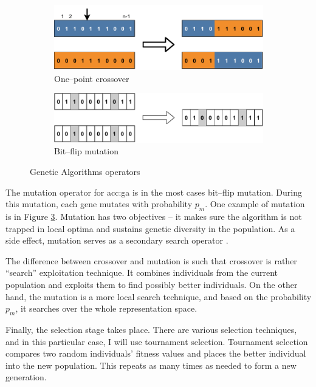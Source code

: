\begin{figure}
    \begin{subfigure}[b]{0.4\textwidth}
        \includegraphics[width=\textwidth]{img/master_onepointcrossover.pdf}
        \caption{One--point crossover}
        \label{fig:gaonepointcrossover}
    \end{subfigure}
    \hfill
    \begin{subfigure}[b]{0.4\textwidth}
        \includegraphics[width=\textwidth]{img/master_bitflipmutation.pdf}
        \caption{Bit--flip mutation}
        \label{fig:bitflipmutation}
    \end{subfigure}
    \caption{Genetic Algorithms operators}
\end{figure}

The mutation operator for \acrshort{acc:ga} is in the most cases bit--flip mutation. During this mutation, each gene mutates with probability $p_m$. One example of mutation is in Figure \ref{fig:bitflipmutation}. Mutation has two objectives -- it makes sure the algorithm is not trapped in local optima and sustains genetic diversity in the population. As a side effect, mutation serves as a secondary search operator \citep{IntroToGA}.

The difference between crossover and mutation is such that crossover is rather \enquote{search} exploitation technique. It combines individuals from the current population and exploits them to find possibly better individuals. On the other hand, the mutation is a more local search technique, and based on the probability $p_m$, it searches over the whole representation space.

Finally, the selection stage takes place. There are various selection techniques, and in this particular case, I will use tournament selection. Tournament selection compares two random individuals' fitness values and places the better individual into the new population. This repeats as many times as needed to form a new generation.

